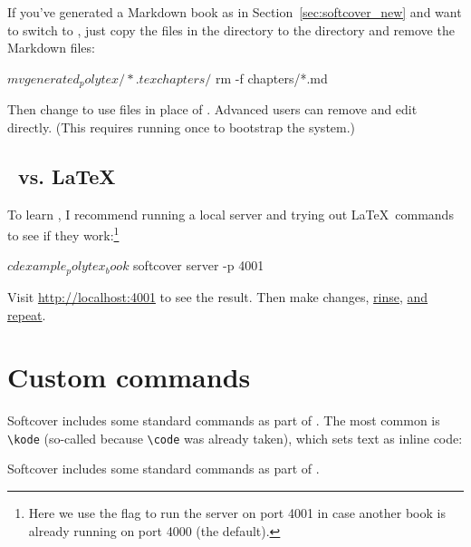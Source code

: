 
If you've generated a Markdown book as in Section~\ref{sec:softcover_new} and want to switch to \PolyTeX, just copy the files in the  directory to the  directory and remove the Markdown files:

\begin{code}
$ mv generated_polytex/*.tex chapters/
$ rm -f chapters/*.md
\end{code}

\noindent Then change  to use  files in place of . Advanced users can remove  and edit  directly. (This requires running  once to bootstrap the system.)

\subsection{\PolyTeX\ vs. \LaTeX} %
\label{sec:polytex_vs_latex}

To learn \PolyTeX, I recommend running a local server and trying out \LaTeX\ commands to see if they work:\footnote{Here we use the  flag to run the server on port 4001 in case another book is already running on port 4000 (the default).}

\begin{code}
$ cd example_polytex_book
$ softcover server -p 4001
\end{code}

\noindent Visit \href{http://localhost:4001}{http://localhost:4001} to see the result. Then make changes, \href{http://www.urbandictionary.com/define.php?term=rinse%20repeat}{rinse}, \href{http://www.urbandictionary.com/define.php?term=rinse%20repeat}{and repeat}.





\section{Custom commands} %
\label{sec:custom_commands}

Softcover includes some standard commands as part of . The most common is \verb+\kode+ (so-called because \verb+\code+ was already taken), which sets text as inline code:

\begin{code}
Softcover includes some standard commands as part of .
\end{code}

